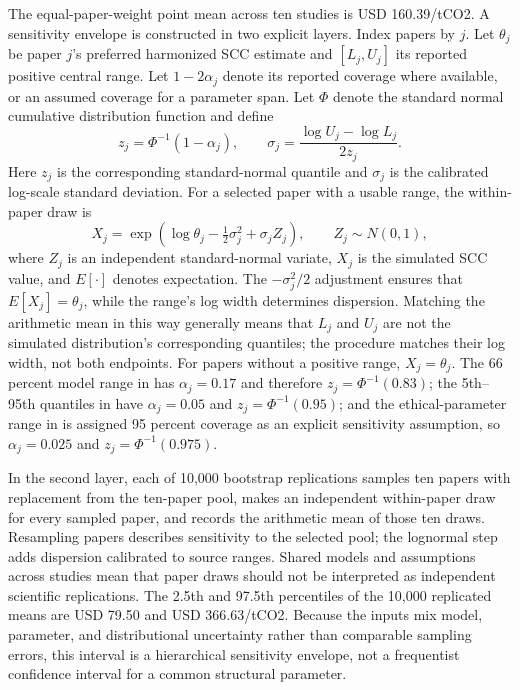 \documentclass[11pt]{article}
\begin{document}
The equal-paper-weight point mean across ten studies is USD 160.39/tCO2. A sensitivity envelope is constructed in two explicit layers. Index papers by $j$. Let $\theta_j$ be paper $j$'s preferred harmonized SCC estimate and $[L_j,U_j]$ its reported positive central range. Let $1-2\alpha_j$ denote its reported coverage where available, or an assumed coverage for a parameter span. Let $\Phi$ denote the standard normal cumulative distribution function and define
\begin{equation*}
z_j=\Phi^{-1}(1-\alpha_j),\qquad
\sigma_j=\frac{\log U_j-\log L_j}{2z_j}.
\end{equation*}
Here $z_j$ is the corresponding standard-normal quantile and $\sigma_j$ is the calibrated log-scale standard deviation. For a selected paper with a usable range, the within-paper draw is
\begin{equation*}
X_j=\exp\!\left(\log\theta_j-\tfrac12\sigma_j^2+\sigma_j Z_j\right),
\qquad Z_j\sim N(0,1),
\end{equation*}
where $Z_j$ is an independent standard-normal variate, $X_j$ is the simulated SCC value, and $E[\cdot]$ denotes expectation. The $-\sigma_j^2/2$ adjustment ensures that $E[X_j]=\theta_j$, while the range's log width determines dispersion. Matching the arithmetic mean in this way generally means that $L_j$ and $U_j$ are not the simulated distribution's corresponding quantiles; the procedure matches their log width, not both endpoints. For papers without a positive range, $X_j=\theta_j$. The 66 percent model range in \citet{ricke2018} has $\alpha_j=0.17$ and therefore $z_j=\Phi^{-1}(0.83)$; the 5th--95th quantiles in \citet{rennert2022} have $\alpha_j=0.05$ and $z_j=\Phi^{-1}(0.95)$; and the ethical-parameter range in \citet{hansel2020} is assigned 95 percent coverage as an explicit sensitivity assumption, so $\alpha_j=0.025$ and $z_j=\Phi^{-1}(0.975)$.

In the second layer, each of 10,000 bootstrap replications samples ten papers with replacement from the ten-paper pool, makes an independent within-paper draw for every sampled paper, and records the arithmetic mean of those ten draws. Resampling papers describes sensitivity to the selected pool; the lognormal step adds dispersion calibrated to source ranges. Shared models and assumptions across studies mean that paper draws should not be interpreted as independent scientific replications. The 2.5th and 97.5th percentiles of the 10,000 replicated means are USD 79.50 and USD 366.63/tCO2. Because the inputs mix model, parameter, and distributional uncertainty rather than comparable sampling errors, this interval is a hierarchical sensitivity envelope, not a frequentist confidence interval for a common structural parameter.
\end{document}

